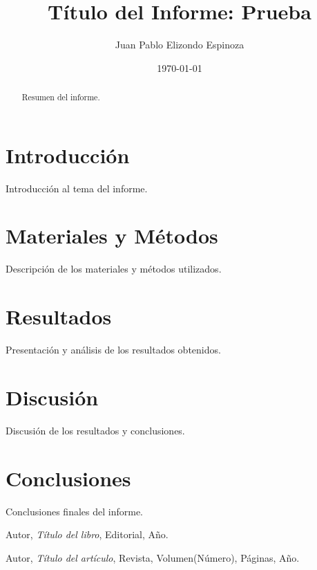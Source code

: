\documentclass[a4paper,12pt]{article}
\title{Título del Informe: Prueba}
\author{Juan Pablo Elizondo Espinoza}
\date{\today}
\begin{document}
\maketitle

\begin{abstract}
    Resumen del informe.
\end{abstract}

\tableofcontents

\section{Introducción}
Introducción al tema del informe.

\section{Materiales y Métodos}
Descripción de los materiales y métodos utilizados.

\section{Resultados}
Presentación y análisis de los resultados obtenidos.

\section{Discusión}
Discusión de los resultados y conclusiones.

\section{Conclusiones}
Conclusiones finales del informe.

\begin{thebibliography}{9}
    Autor, \textit{Título del libro}, Editorial, Año.
    
    Autor, \textit{Título del artículo}, Revista, Volumen(Número), Páginas, Año.
\end{thebibliography}
\end{document}
